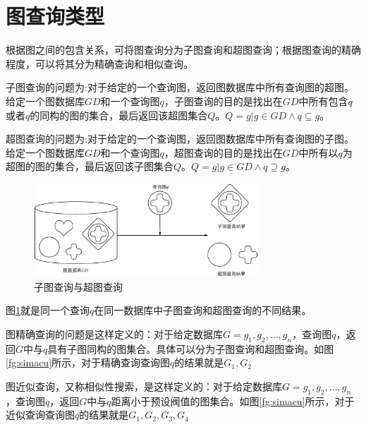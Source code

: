 \documentclass{XDBAthesis}
\begin{document}
\section{图查询类型}
根据图之间的包含关系，可将图查询分为子图查询和超图查询；根据图查询的精确程度，可以将其分为精确查询和相似查询\cite{g13}。
\begin{defn}[子图查询]\cite{FSD}
子图查询的问题为:对于给定的一个查询图，返回图数据库中所有查询图的超图。给定一个图数据库$GD$和一个查询图$q$，子图查询的目的是找出在$GD$中所有包含$q$或者$q$的同构的图的集合，最后返回该超图集合$Q$。$Q={g|g\in GD\wedge q\subseteq g}$。
\end{defn}
\begin{defn}[超图查询]\cite{ssosc}
超图查询的问题为:对于给定的一个查询图，返回图数据库中所有查询图的子图。给定一个图数据库$GD$和一个查询图$q$，超图查询的目的是找出在$GD$中所有以$q$为超图的图的集合，最后返回该子图集合$Q$。$Q={g|g\in GD\wedge q\supseteq g}$。    
\end{defn}

\begin{figure}[htb]
    \centering
    \includegraphics[width=0.75\textwidth]{Database.eps}
    \caption{子图查询与超图查询}
    \label{fg:subsup}
\end{figure}

图\ref{fg:subsup}就是同一个查询$q$在同一数据库中子图查询和超图查询的不同结果。



\begin{defn}[精确查询]\cite{gIndex}
图精确查询的问题是这样定义的：对于给定数据库$G={g_1 ,g_2 ,...,g_n }$，查询图$q$，返回$G$中与$q$具有子图同构的图集合。具体可以分为子图查询和超图查询。如图\ref{fg:simacu}所示，对于精确查询查询图$q$的结果就是$G_1 ,G_2 $
\end{defn}


\begin{defn}[近似查询]\cite{gghash}
图近似查询，又称相似性搜索，是这样定义的：对于给定数据库$G={g_1 ,g_2 ,...,g_n }$，查询图$q$，返回$G$中与$q$距离小于预设阀值的图集合。如图\ref{fg:simacu}所示，对于近似查询查询图$q$的结果就是$G_1 ,G_2 ,G_3 ,G_4 $
\end{defn}
\end{document}
